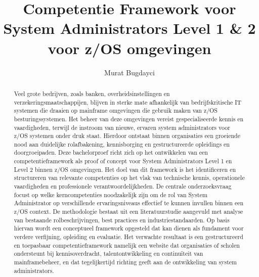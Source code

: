 \documentclass{hogent-article}
\title{Competentie Framework voor System Administrators Level 1 \& 2 voor z/OS omgevingen}
\author{Murat Bugdayci}
\begin{document}
\begin{abstract}
	Veel grote bedrijven, zoals banken, overheidsinstellingen en verzekeringsmaatschappijen, blijven in sterke mate afhankelijk van bedrijfskritische IT systemen die draaien op mainframe omgevingen die gebruik maken van z/OS besturingssystemen. Het beheer van deze omgevingen vereist gespecialiseerde kennis en vaardigheden, terwijl de instroom van nieuwe, ervaren system administrators voor z/OS systemen onder druk staat. Hierdoor ontstaat binnen organisaties een groeiende nood aan duidelijke rolafbakening, kennisborging en gestructureerde opleidings en doorgroeipaden.
	Deze bachelorproef richt zich op het ontwikkelen van een competentieframework als proof of concept voor System Administrators Level 1 en Level 2 binnen z/OS omgevingen. Het doel van dit framework is het identificeren en structureren van relevante competenties op het vlak van technische kennis, operationele vaardigheden en professionele verantwoordelijkheden.
	De centrale onderzoeksvraag focust op welke kerncompetenties noodzakelijk zijn om de rol van System Administrator op verschillende ervaringsniveaus effectief te kunnen invullen binnen een z/OS context. De methodologie bestaat uit een literatuurstudie aangevuld met analyse van bestaande rolbeschrijvingen, best practices en industriestandaarden. Op basis hiervan wordt een conceptueel framework opgesteld dat kan dienen als fundament voor verdere verfijning, opleiding en evaluatie.
	Het verwachte resultaat is een gestructureerd en toepasbaar competentieframework namelijk een website dat organisaties of scholen ondersteunt bij kennisoverdracht, talentontwikkeling en continuïteit van mainframebeheer, en dat tegelijkertijd richting geeft aan de ontwikkeling van system administrators.
\end{abstract}


\tableofcontents



\printbibliography[heading=bibintoc]
\end{document}
